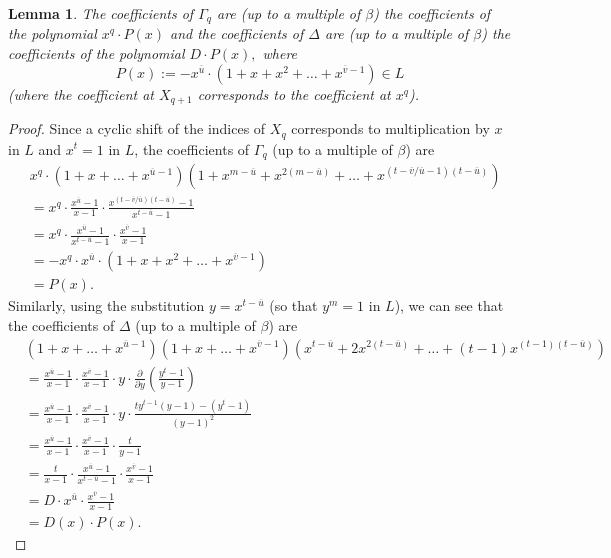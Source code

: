 \documentclass[12pt,a4paper]{article}
\newtheorem{lemma}[theorem]{Lemma}
\newcommand{\uo}{\overline{u}}
\newcommand{\vo}{\overline{v}}
\begin{document}
\begin{lemma}
The coefficients of $\Gamma_q$ are (up to a multiple of $\beta$) the coefficients of the polynomial $x^q\cdot P(x)$ and the coefficients of $\Delta$ are (up to a multiple of $\beta$) the coefficients of the polynomial $D\cdot P(x),$ where
$$P(x):=-x^{\uo}\cdot (1+x+x^2+\dots+x^{\vo-1})\in L$$
(where the coefficient at $X_{q+1}$ corresponds to the coefficient at $x^q$).
\end{lemma}
\begin{proof}
Since a cyclic shift of the indices of $X_q$ corresponds to multiplication by $x$ in $L$ and $x^t=1$ in $L$, the coefficients of $\Gamma_q$ (up to a multiple of $\beta$) are
\begin{equation*}\label{Gamma}
\begin{split}
&x^q\cdot(1+x+\dots+x^{\uo-1})(1+x^{m-\uo}+x^{2(m-\uo)}+\dots+x^{(t-\vo/\uo-1)(t-\uo)})\\
&=x^q\cdot\frac{x^{\uo}-1}{x-1}\cdot \frac{x^{(t-\vo/\uo)(t-\uo)}-1}{x^{t-\uo}-1}\\
&=x^q\cdot\frac{x^{\uo}-1}{x^{t-\uo}-1}\cdot \frac{x^{\vo}-1}{x-1}\\
&=-x^q\cdot x^{\uo}\cdot (1+x+x^2+\dots+x^{\vo-1})\\
&=P(x).
\end{split}
\end{equation*}
Similarly, using the substitution $y=x^{t-\uo}$ (so that $y^m=1$ in $L$), we can see that the coefficients of $\Delta$ (up to a multiple of $\beta$) are 
\begin{equation*}\label{Delta}
\begin{split}
&(1+x+\dots+x^{\uo-1})(1+x+\dots+x^{\vo-1})(x^{t-\uo}+2x^{2(t-\uo)}+\dots+(t-1)x^{(t-1)(t-\uo)})\\
&=\frac{x^{\uo}-1}{x-1}\cdot \frac{x^{\vo}-1}{x-1}\cdot y \cdot \frac{\partial}{\partial y} \left(\frac{y^{t}-1}{y-1}\right)\\
&=\frac{x^{\uo}-1}{x-1}\cdot \frac{x^{\vo}-1}{x-1}\cdot y \cdot \frac{ty^{t-1}(y-1)-(y^t-1)}{(y-1)^2}\\
&=\frac{x^{\uo}-1}{x-1}\cdot \frac{x^{\vo}-1}{x-1} \cdot \frac{t}{y-1}\\
&=\frac{t}{x-1}\cdot \frac{x^{\uo}-1}{x^{t-\uo}-1}\cdot \frac{x^{\vo}-1}{x-1}\\
&=D\cdot x^{\uo}\cdot\frac{x^{\vo}-1}{x-1}\\
&=D(x)\cdot P(x).
\end{split}
\end{equation*}
\end{proof}
\end{document}
